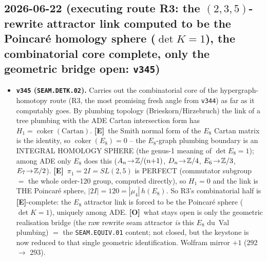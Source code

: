 \documentclass[11pt]{article}
\providecommand{\mE}{\textbf{[E]}}\providecommand{\mC}{\textbf{[C]}}
\providecommand{\mO}{\textbf{[O]}}\providecommand{\mX}{\textbf{[X]}}
\providecommand{\vref}[1]{\texttt{#1}}
\begin{document}
\subsection*{2026-06-22 (executing route R3: the $(2,3,5)$-rewrite attractor link computed to be the Poincar\'e homology sphere ($\det K{=}1$), the combinatorial core complete, only the geometric bridge open: \texttt{v345})}
\begin{itemize}
\item \textbf{\texttt{v345} (\texttt{SEAM.DETK.02}).} Carries out the combinatorial core of the hypergraph-homotopy
route (R3, the most promising fresh angle from \vref{v344}) as far as it computably goes. By plumbing topology
(Brieskorn/Hirzebruch) the link of a tree plumbing with the ADE Cartan intersection form has
$H_1=\operatorname{coker}(\mathrm{Cartan})$. \mE\ the Smith normal form of the $E_8$ Cartan matrix is the identity,
so $\operatorname{coker}(E_8)=0$ -- the $E_8$-graph plumbing boundary is an INTEGRAL HOMOLOGY SPHERE (the genus-1
meaning of $\det E_8{=}1$); among ADE only $E_8$ does this ($A_n\!\to\!\mathbb{Z}/(n{+}1)$, $D_n\!\to\!\mathbb{Z}/4$,
$E_6\!\to\!\mathbb{Z}/3$, $E_7\!\to\!\mathbb{Z}/2$). \mE\ $\pi_1=2I=SL(2,5)$ is PERFECT (commutator subgroup $=$ the whole order-120
group, computed directly), so $H_1=0$ and the link is THE Poincar\'e sphere, $|2I|=120=|\mu_4|\,h(E_8)$. So R3's
combinatorial half is \mE-complete: the $E_8$ attractor link is forced to be the Poincar\'e sphere ($\det K{=}1$),
uniquely among ADE. \mO\ what stays open is only the geometric realisation bridge (the raw rewrite seam attractor
\emph{is} this $E_8$ du~Val plumbing) $=$ the \texttt{SEAM.EQUIV.01} content; not closed, but the keystone is now
reduced to that single geometric identification. Wolfram mirror $+1$ (292 $\to$ 293).
\end{itemize}
\end{document}
